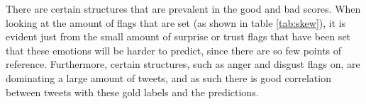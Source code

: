\begin{table}[H]
\caption{Tweets and their corresponding gold classification list, good predictions}
\label{tab:classerrorlow}
\end{table}
There are certain structures that are prevalent in the good and bad scores. When looking at the amount of flags that are set (as shown in table \ref{tab:skew}), it is evident just from the small amount of surprise or trust flags that have been set that these emotions will be harder to predict, since there are so few points of reference. Furthermore, certain structures, such as anger and disgust flags on, are dominating a large amount of tweets, and as such there is good correlation between tweets with these gold labels and the predictions.


